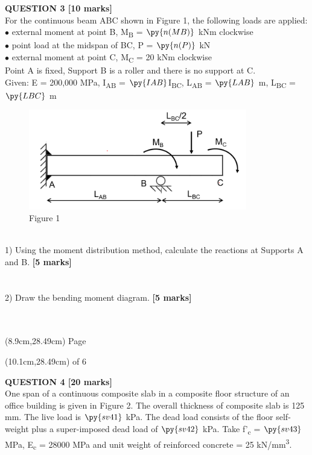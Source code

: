 \documentclass[a4paper,11pt]{article}
\begin{document}
\noindent
\textbf{QUESTION 3 [10 marks]}\\
For the continuous beam ABC shown in Figure 1, the following loads are applied:\\
$\bullet$ external moment at point B, M\textsubscript{B} = $\py{n(MB)}$ kNm clockwise\\
$\bullet$ point load at the midspan of BC, P = $\py{n(P)}$ kN\\
$\bullet$ external moment at point C, M\textsubscript{C} = 20 kNm clockwise\\
Point A is fixed, Support B is a roller and there is no support at C.\\
Given: E = 200,000 MPa, I\textsubscript{AB} = $\py{IAB}$I\textsubscript{BC}, L\textsubscript{AB} = $\py{LAB}$ m, L\textsubscript{BC} = $\py{LBC}$ m\\
\begin{figure}[ht]
\includegraphics[width=9.53cm, height=4.37cm]{Figure1.png}\\
\centering
Figure 1\\
\centering
\end{figure}
\\
1) Using the moment distribution method, calculate the reactions at Supports A and B. \textbf{[5 marks]}
\\
\\
\\
2) Draw the bending moment diagram. \textbf{[5 marks]}
\\
\\
\\
\begin{textblock*}{5cm}(8.9cm,28.49cm)
Page
\end{textblock*}
\begin{textblock*}{5cm}(10.1cm,28.49cm)
of 6
\end{textblock*}
\newpage
\noindent
\textbf{QUESTION 4 [20 marks]}\\
One span of a continuous composite slab in a composite floor structure of an office building is given in Figure 2. The overall thickness of composite slab is 125 mm. The live load is $\py{sv41}$ kPa. The dead load consists of the floor self-weight plus a super-imposed dead load of $\py{sv42}$ kPa. Take f'\textsubscript{c} = $\py{sv43}$ MPa, E\textsubscript{c} = 28000 MPa and unit weight of reinforced concrete = 25 kN/mm\textsuperscript{3}.\\
\end{document}
